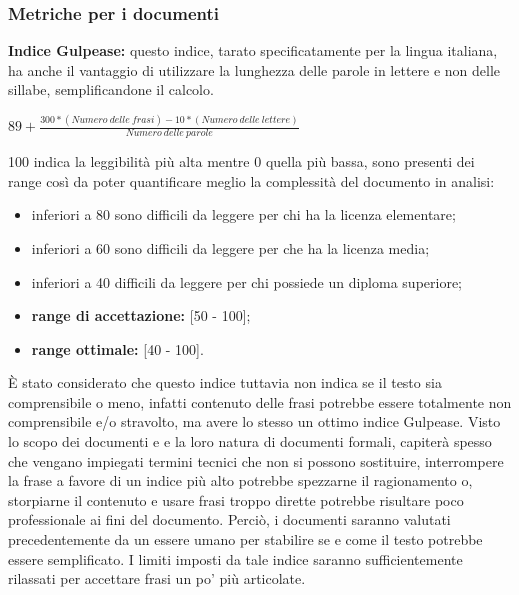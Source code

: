 		\subsubsection{Metriche per i documenti}
		\textbf{Indice Gulpease:} questo indice, tarato specificatamente per la lingua italiana, ha anche il vantaggio di utilizzare la lunghezza delle parole in lettere e non delle sillabe, semplificandone il calcolo.
			\begin{center}
				\begin{math}
					89+\frac{300 * (Numero\ delle\ frasi) - 10 * (Numero\ delle\ lettere)}{Numero\ delle\ parole}
				\end{math}
			\end{center}
		100 indica la leggibilità più alta mentre 0 quella più bassa, sono presenti dei range così da poter quantificare meglio la complessità del documento in analisi:
			\begin{itemize}
				\item inferiori a 80 sono difficili da leggere per chi ha la licenza elementare;
				\item inferiori a 60 sono difficili da leggere per che ha la licenza media;
				\item inferiori a 40 difficili da leggere per chi possiede un diploma superiore;
			\end{itemize}
			\begin{itemize}
					\item \textbf{range di accettazione:} [50 - 100];
					\item \textbf{range ottimale:} [40 - 100].
			\end{itemize}

È stato considerato che questo indice tuttavia non indica se il testo sia comprensibile o meno, infatti contenuto delle frasi potrebbe essere totalmente non comprensibile e/o stravolto, ma
avere lo stesso un ottimo indice Gulpease. Visto lo scopo dei documenti e e la loro natura di documenti formali, capiterà spesso che vengano impiegati termini tecnici che non si possono sostituire, interrompere la frase a favore di un indice più alto potrebbe spezzarne il ragionamento o, storpiarne il contenuto e usare frasi troppo dirette potrebbe risultare poco professionale ai fini del documento. Perciò, i documenti saranno valutati precedentemente da un essere umano per stabilire se e come il testo potrebbe essere semplificato. I limiti imposti da tale indice saranno sufficientemente rilassati per accettare frasi un po' più articolate.
